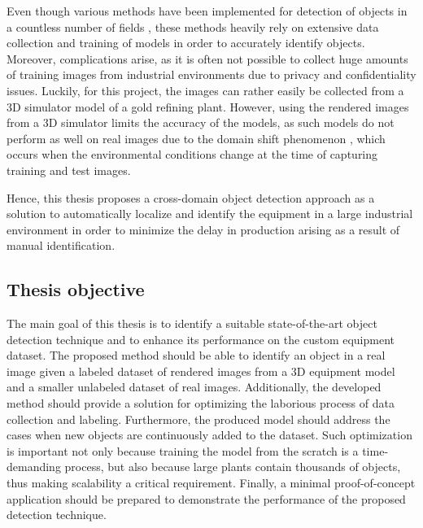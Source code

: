 \documentclass[english, 12pt, a4paper, elec, utf8, a-1b, online]{aaltothesis}
\begin{document}
Even though various methods have been implemented for detection of objects in a countless number of fields \cite{ima, Liu2015, He2017, Redmon2015a, Zhang2021b, Tian2019}, these methods heavily rely on extensive data collection and training of models in order to accurately identify objects. Moreover, complications arise, as it is often not possible to collect huge amounts of training images from industrial environments due to privacy and confidentiality issues. Luckily, for this project, the images can rather easily be collected from a 3D simulator model of a gold refining plant. However, using the rendered images from a 3D simulator limits the accuracy of the models, as such models do not perform as well on real images due to the domain shift phenomenon \cite{Ganin2015}, which occurs when the environmental conditions change at the time of capturing training and test images. 

Hence, this thesis proposes a cross-domain object detection approach as a solution to automatically localize and identify the equipment in a large industrial environment in order to minimize the delay in production arising as a result of manual identification. 


\clearpage

\subsection{Thesis objective}
\label{objective} 
The main goal of this thesis is to identify a suitable state-of-the-art object detection technique and to enhance its performance on the custom equipment dataset. The proposed method should be able to identify an object in a real image given a labeled dataset of rendered images from a 3D equipment model and a smaller unlabeled dataset of real images. Additionally, the developed method should provide a solution for optimizing the laborious process of data collection and labeling. Furthermore, the produced model should address the cases when new objects are continuously added to the dataset.  Such optimization is important not only because training the model from the scratch is a time-demanding process, but also because large plants contain thousands of objects, thus making scalability a critical requirement. Finally, a minimal proof-of-concept application should be prepared to demonstrate the performance of the proposed detection technique.  
\end{document}
